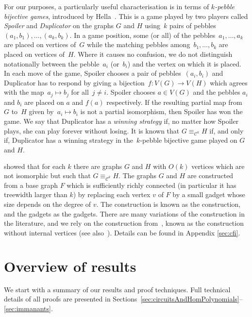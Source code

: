 \documentclass[11pt, DIV=15]{scrarticle}
\theoremstyle{definition}
\theoremstyle{plain}
\theoremstyle{remark}
\begin{document}
For our purposes, a particularly useful characterisation is in terms
of \emph{$k$-pebble bijective games}, introduced by
Hella~\cite{hella96}.  This is a game played by two players called
\emph{Spoiler} and \emph{Duplicator} on the graphs $G$ and $H$ using~$k$
pairs of pebbles~$(a_1,b_1),\dots,(a_k,b_k)$.  In a game position,
some (or all) of the pebbles~$a_1,\ldots,a_k$ are placed on vertices 
of~$G$ while the matching pebbles among~$b_1,\ldots,b_k$ are
placed on vertices of~$H$.  Where it causes no confusion, we
do not distinguish notationally between the pebble~$a_i$ (or~$b_i$)
and the vertex on which it is placed.  In each move of the game, Spoiler
chooses a pair of pebbles~$(a_i,b_i)$ and Duplicator has to respond by
giving a bijection~$f: V(G) \rightarrow V(H)$ which agrees with
the map~$a_j \mapsto b_j$ for all~$j \neq i$.    Spoiler chooses $a
\in V(G)$ and the pebbles $a_i$ and $b_i$ are placed on $a$ and $f(a)$
respectively.  If the resulting partial map from~$G$ to~$H$ given
by~$a_i \mapsto b_i$ is not a partial isomorphism, then Spoiler has
won the game.   We say that Duplicator has a \emph{winning
	strategy} if, no matter how Spoiler plays, she can play forever
without losing.  It is known that $G  \equiv_{\mathcal{C}^k} H$ if, and only if, Duplicator has a winning
strategy in the~$k$-pebble bijective game played on $G$ and $H$.

\textcite{CFI} showed that for each $k$ there
are graphs $G$ and $H$ with $O(k)$ vertices which are not
isomorphic but such that $G  \equiv_{\mathcal{C}^k} H$.  The graphs
$G$ and $H$ are constructed from a base graph $F$ which is
sufficiently richly connected (in particular it has treewidth larger
than $k$) by replacing each vertex $v$ of $F$ by a small gadget whose
size depends on the degree of $v$.  The construction is known as the
 construction, and the gadgets as the
 gadgets.  There are many variations of the
construction in the literature, and we rely on the construction
from~\cite{roberson_oddomorphisms_2022}, known as the
 construction without internal
vertices (see also~\cite{rossman_csl25}). Details can be found in Appendix \ref{sec:cfi}.


	

	
\section{Overview of results}

We start with a summary of our results and proof techniques. Full technical details of all proofs are presented in Sections~\ref{sec:circuitsAndHomPolynomials}--\ref{sec:immanants}.  
\end{document}
